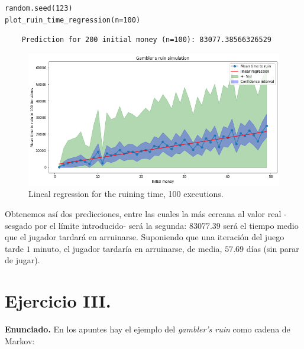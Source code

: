 \documentclass[a4paper]{article}
\begin{document}
\begin{verbatim}
random.seed(123)
plot_ruin_time_regression(n=100)
\end{verbatim}

\begin{verbatim}
	Prediction for 200 initial money (n=100): 83077.38566326529
\end{verbatim}

\begin{figure}[H]
	\includegraphics[scale=.6]{figures/gambler3_1}
	\centering
	\caption{Lineal regression for the ruining time, 100 executions.}
\end{figure}

Obtenemos así dos predicciones, entre las cuales la más cercana al valor real -sesgado por el límite introducido- será la segunda: $83077.39$ será el tiempo medio que el jugador tardará en arruinarse. Suponiendo que una iteración del juego tarde $1$ minuto, el jugador tardaría en arruinarse, de media, $57.69$ días (sin parar de jugar).


\section*{Ejercicio III.}

\textbf{Enunciado.} En los apuntes hay el ejemplo del \emph{gambler's ruin} como cadena de Markov:
\end{document}
